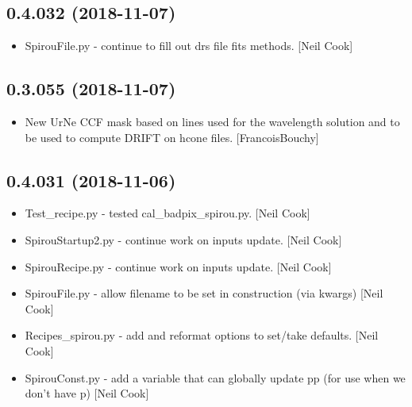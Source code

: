 \documentclass[a4paper,10pt,english]{report}
\begin{document}
\subsection{0.4.032 (2018-11-07)}
\label{\detokenize{misc/changelog:id265}}\begin{itemize}
\item {} 
SpirouFile.py - continue to fill out drs file fits methods. {[}Neil
Cook{]}

\end{itemize}


\subsection{0.3.055 (2018-11-07)}
\label{\detokenize{misc/changelog:id266}}\begin{itemize}
\item {} 
New UrNe CCF mask based on lines used for the wavelength solution and
to be used to compute DRIFT on hcone files. {[}FrancoisBouchy{]}

\end{itemize}


\subsection{0.4.031 (2018-11-06)}
\label{\detokenize{misc/changelog:id267}}\begin{itemize}
\item {} 
Test\_recipe.py - tested cal\_badpix\_spirou.py. {[}Neil Cook{]}

\item {} 
SpirouStartup2.py - continue work on inputs update. {[}Neil Cook{]}

\item {} 
SpirouRecipe.py - continue work on inputs update. {[}Neil Cook{]}

\item {} 
SpirouFile.py - allow filename to be set in construction (via kwargs)
{[}Neil Cook{]}

\item {} 
Recipes\_spirou.py - add and reformat options to set/take defaults.
{[}Neil Cook{]}

\item {} 
SpirouConst.py - add a variable that can globally update pp (for use
when we don’t have p) {[}Neil Cook{]}

\end{itemize}
\end{document}
